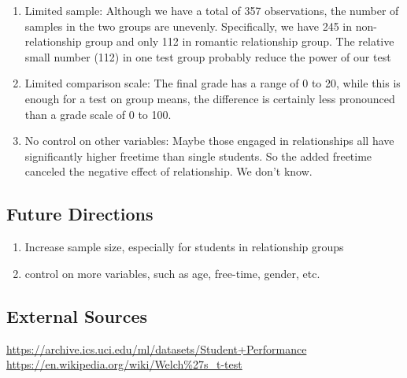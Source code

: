 \documentclass[]{article}
\providecommand{\tightlist}{%
  \setlength{\itemsep}{0pt}\setlength{\parskip}{0pt}}
\begin{document}
\begin{enumerate}
\def\labelenumi{\arabic{enumi}.}
\item
  Limited sample: Although we have a total of 357 observations, the
  number of samples in the two groups are unevenly. Specifically, we
  have 245 in non-relationship group and only 112 in romantic
  relationship group. The relative small number (112) in one test group
  probably reduce the power of our test
\item
  Limited comparison scale: The final grade has a range of 0 to 20,
  while this is enough for a test on group means, the difference is
  certainly less pronounced than a grade scale of 0 to 100.
\item
  No control on other variables: Maybe those engaged in relationships
  all have significantly higher freetime than single students. So the
  added freetime canceled the negative effect of relationship. We don't
  know.
\end{enumerate}

\subsection{Future Directions}\label{future-directions}

\begin{enumerate}
\def\labelenumi{\arabic{enumi}.}
\tightlist
\item
  Increase sample size, especially for students in relationship groups
\item
  control on more variables, such as age, free-time, gender, etc.
\end{enumerate}

\subsection{External Sources}\label{external-sources}

\url{https://archive.ics.uci.edu/ml/datasets/Student+Performance}
\url{https://en.wikipedia.org/wiki/Welch\%27s_t-test}
\end{document}
